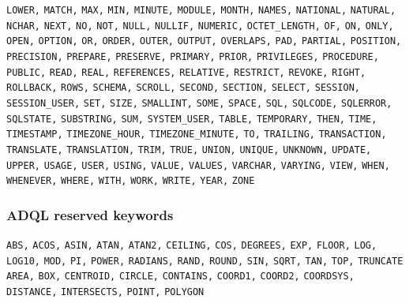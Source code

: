 \documentclass[11pt,a4paper]{ivoa}
\begin{document}
\texttt{LOWER,} \texttt{MATCH,} \texttt{MAX,} \texttt{MIN,} 
\texttt{MINUTE,} \texttt{MODULE,} \texttt{MONTH,} \texttt{NAMES,} 
\texttt{NATIONAL,} \texttt{NATURAL,} \texttt{NCHAR,} \texttt{NEXT,} 
\texttt{NO,} \texttt{NOT,} \texttt{NULL,} \texttt{NULLIF,} 
\texttt{NUMERIC,} \texttt{OCTET\_LENGTH,} \texttt{OF,} \texttt{ON,} 
\texttt{ONLY,} \texttt{OPEN,} \texttt{OPTION,} \texttt{OR,} 
\texttt{ORDER,} \texttt{OUTER,} \texttt{OUTPUT,} \texttt{OVERLAPS,} 
\texttt{PAD,} \texttt{PARTIAL,} \texttt{POSITION,} 
\texttt{PRECISION,} \texttt{PREPARE,} \texttt{PRESERVE,} 
\texttt{PRIMARY,} \texttt{PRIOR,} \texttt{PRIVILEGES,} 
\texttt{PROCEDURE,} \texttt{PUBLIC,} \texttt{READ,} \texttt{REAL,} 
\texttt{REFERENCES,} \texttt{RELATIVE,} \texttt{RESTRICT,} 
\texttt{REVOKE,} \texttt{RIGHT,} \texttt{ROLLBACK,} \texttt{ROWS,} 
\texttt{SCHEMA,} \texttt{SCROLL,} \texttt{SECOND,} \texttt{SECTION,} 
\texttt{SELECT,} \texttt{SESSION,} \texttt{SESSION\_USER,} 
\texttt{SET,} \texttt{SIZE,} \texttt{SMALLINT,} \texttt{SOME,} 
\texttt{SPACE,} \texttt{SQL,} \texttt{SQLCODE,} \texttt{SQLERROR,} 
\texttt{SQLSTATE,} \texttt{SUBSTRING,} \texttt{SUM,} 
\texttt{SYSTEM\_USER,} \texttt{TABLE,} \texttt{TEMPORARY,} 
\texttt{THEN,} \texttt{TIME,} \texttt{TIMESTAMP,} 
\texttt{TIMEZONE\_HOUR,} \texttt{TIMEZONE\_MINUTE,} \texttt{TO,} 
\texttt{TRAILING,} \texttt{TRANSACTION,} \texttt{TRANSLATE,} 
\texttt{TRANSLATION,} \texttt{TRIM,} \texttt{TRUE,} \texttt{UNION,} 
\texttt{UNIQUE,} \texttt{UNKNOWN,} \texttt{UPDATE,} \texttt{UPPER,} 
\texttt{USAGE,} \texttt{USER,} \texttt{USING,} \texttt{VALUE,} 
\texttt{VALUES,} \texttt{VARCHAR,} \texttt{VARYING,} \texttt{VIEW,} 
\texttt{WHEN,} \texttt{WHENEVER,} \texttt{WHERE,} \texttt{WITH,} 
\texttt{WORK,} \texttt{WRITE,} \texttt{YEAR,} \texttt{ZONE} 

\subsubsection{ADQL reserved keywords}
\label{sec:adql.keywords}

\noindent
\texttt{ABS,} \texttt{ACOS,} \texttt{ASIN,} \texttt{ATAN,} 
\texttt{ATAN2,} \texttt{CEILING,} \texttt{COS,} \texttt{DEGREES,} 
\texttt{EXP,} \texttt{FLOOR,} \texttt{LOG,} \texttt{LOG10,} 
\texttt{MOD,} \texttt{PI,} \texttt{POWER,} \texttt{RADIANS,} 
\texttt{RAND,} \texttt{ROUND,} \texttt{SIN,} \texttt{SQRT,} 
\texttt{TAN,} \texttt{TOP,} \texttt{TRUNCATE}
\newline
\newline
\noindent
\texttt{AREA,} \texttt{BOX,} \texttt{CENTROID,} \texttt{CIRCLE,} 
\texttt{CONTAINS,} \texttt{COORD1,} \texttt{COORD2,} 
\texttt{COORDSYS,} \texttt{DISTANCE,} \texttt{INTERSECTS,} 
\texttt{POINT,} \texttt{POLYGON}
\end{document}
